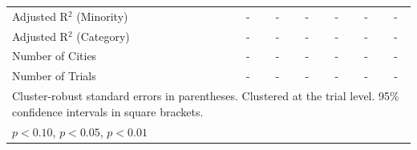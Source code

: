 \begin{table}[htbp]
{\begin{tabular}{l*{6}{c}}
Adjusted R$^2$ (Minority)    &     -   &     -   &     -   &     -   &     -   & - \\
Adjusted R$^2$ (Category)     &     -   &     -   &     -   &     -   &     -   & - \\
Number of Cities    &        -   &        -   &         -   &         -   &         -   & - \\
Number of Trials & - & - & - & - & - & - \\
\bottomrule
\multicolumn{7}{l}{\footnotesize Cluster-robust standard errors in parentheses. Clustered at the trial level. 95\% confidence intervals in square brackets.}\\
\multicolumn{7}{l}{\footnotesize \sym{*} \(p<0.10\), \sym{**} \(p<0.05\), \sym{***} \(p<0.01\)}\\
\end{tabular}
}
\end{table}

